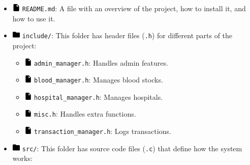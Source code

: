 \documentclass[12pt,a4paper]{report}
\begin{document}
\begin{itemize}
    \item \includegraphics[width=0.03\textwidth]{../resources/assets/images/file_icon.png} \texttt{README.md}: A file with an overview of the project, how to install it, and how to use it.
    \item \includegraphics[width=0.03\textwidth]{../resources/assets/images/folder_icon.png} \texttt{include/}: This folder has header files (\texttt{.h}) for different parts of the project:
    \begin{itemize}
        \item \includegraphics[width=0.03\textwidth]{../resources/assets/images/file_icon.png} \texttt{admin\_manager.h}: Handles admin features.
        \item \includegraphics[width=0.03\textwidth]{../resources/assets/images/file_icon.png} \texttt{blood\_manager.h}: Manages blood stocks.
        \item \includegraphics[width=0.03\textwidth]{../resources/assets/images/file_icon.png} \texttt{hospital\_manager.h}: Manages hospitals.
        \item \includegraphics[width=0.03\textwidth]{../resources/assets/images/file_icon.png} \texttt{misc.h}: Handles extra functions.
        \item \includegraphics[width=0.03\textwidth]{../resources/assets/images/file_icon.png} \texttt{transaction\_manager.h}: Logs transactions.
    \end{itemize}
    \item \includegraphics[width=0.03\textwidth]{../resources/assets/images/folder_icon.png} \texttt{src/}: This folder has source code files (\texttt{.c}) that define how the system works:

\end{itemize}
\end{document}
